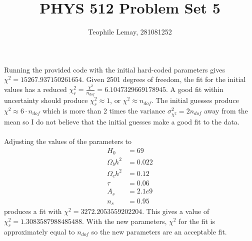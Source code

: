 \documentclass{article}
\title{PHYS 512 Problem Set 5}
\author{Teophile Lemay, 281081252}
\date{}
\newcommand{\<}[1]{\left\langle #1 \right\rangle }
\begin{document}
\maketitle

\section{}
Running the provided code with the initial hard-coded parameters gives $\chi^2 = 15267.937150261654$. Given 2501  degrees of freedom, the fit for the initial values has a reduced $\chi^2_{r} = \frac{\chi^2}{n_{dof}} = 6.1047329669178945$. A good fit within uncertainty should produce $\chi^2_r \approx 1$, or $\chi^2 \approx n_{dof}$. The initial guesses produce $\chi^2 \approx 6\cdot n_{dof}$ which is more than 2 times the variance $\sigma^2_{\chi^2} = 2n_{dof}$ away from the mean so I do not believe that the initial guesses make a good fit to the data.\\
\\
Adjusting the values of the parameters to 
\begin{align*}
	H_0 &= 69\\
	\Omega_b h^2 &= 0.022\\
	\Omega_c h^2 &= 0.12\\
	\tau &= 0.06\\
	A_s &= 2.1e9\\
	n_s &= 0.95
\end{align*}
produces a fit with $\chi^2 = 3272.2053559202204$. This gives a value of $\chi^2_r = 1.3083587988485488$. With the new parameters, $\chi^2$ for the fit is approximately equal to $n_{dof}$ so the new parameters are an acceptable fit.
\end{document}

